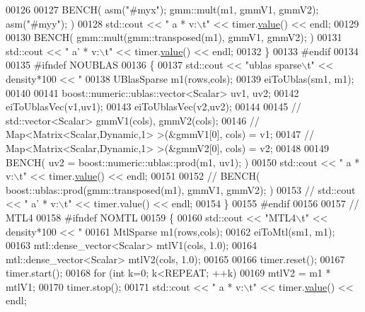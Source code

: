 \begin{DoxyCode}
{{{{00126 
00127       BENCH( \textcolor{keyword}{asm}(\textcolor{stringliteral}{"#myx"}); gmm::mult(m1, gmmV1, gmmV2); \textcolor{keyword}{asm}(\textcolor{stringliteral}{"#myy"}); )
00128       std::cout << \textcolor{stringliteral}{"   a * v:\(\backslash\)t"} << timer.\hyperlink{class_eigen_1_1_bench_timer_a26760f963ed8b64c126159bfea57735e}{value}() << endl;
00129 
00130       BENCH( gmm::mult(gmm::transposed(m1), gmmV1, gmmV2); )
00131       std::cout << \textcolor{stringliteral}{"   a' * v:\(\backslash\)t"} << timer.\hyperlink{class_eigen_1_1_bench_timer_a26760f963ed8b64c126159bfea57735e}{value}() << endl;
00132     \}
00133 \textcolor{preprocessor}{    #endif}
00134     
00135 \textcolor{preprocessor}{    #ifndef NOUBLAS}
00136     \{
00137       std::cout << \textcolor{stringliteral}{"ublas sparse\(\backslash\)t"} << density*100 << \textcolor{stringliteral}{"%
00138       UBlasSparse m1(rows,cols);
00139       eiToUblas(sm1, m1);
00140       
00141       boost::numeric::ublas::vector<Scalar> uv1, uv2;
00142       eiToUblasVec(v1,uv1);
00143       eiToUblasVec(v2,uv2);
00144 
00145 \textcolor{comment}{//       std::vector<Scalar> gmmV1(cols), gmmV2(cols);}
00146 \textcolor{comment}{//       Map<Matrix<Scalar,Dynamic,1> >(&gmmV1[0], cols) = v1;}
00147 \textcolor{comment}{//       Map<Matrix<Scalar,Dynamic,1> >(&gmmV2[0], cols) = v2;}
00148 
00149       BENCH( uv2 = boost::numeric::ublas::prod(m1, uv1); )
00150       std::cout << \textcolor{stringliteral}{"   a * v:\(\backslash\)t"} << timer.\hyperlink{class_eigen_1_1_bench_timer_a26760f963ed8b64c126159bfea57735e}{value}() << endl;
00151 
00152 \textcolor{comment}{//       BENCH( boost::ublas::prod(gmm::transposed(m1), gmmV1, gmmV2); )}
00153 \textcolor{comment}{//       std::cout << "   a' * v:\(\backslash\)t" << timer.value() << endl;}
00154     \}
00155 \textcolor{preprocessor}{    #endif}
00156 
00157     \textcolor{comment}{// MTL4}
00158 \textcolor{preprocessor}{    #ifndef NOMTL}
00159     \{
00160       std::cout << \textcolor{stringliteral}{"MTL4\(\backslash\)t"} << density*100 << \textcolor{stringliteral}{"%
00161       MtlSparse m1(rows,cols);
00162       eiToMtl(sm1, m1);
00163       mtl::dense\_vector<Scalar> mtlV1(cols, 1.0);
00164       mtl::dense\_vector<Scalar> mtlV2(cols, 1.0);
00165 
00166       timer.reset();
00167       timer.start();
00168       \textcolor{keywordflow}{for} (\textcolor{keywordtype}{int} k=0; k<REPEAT; ++k)
00169         mtlV2 = m1 * mtlV1;
00170       timer.stop();
00171       std::cout << \textcolor{stringliteral}{"   a * v:\(\backslash\)t"} << timer.\hyperlink{class_eigen_1_1_bench_timer_a26760f963ed8b64c126159bfea57735e}{value}() << endl;
}}}}}}
\end{DoxyCode}
